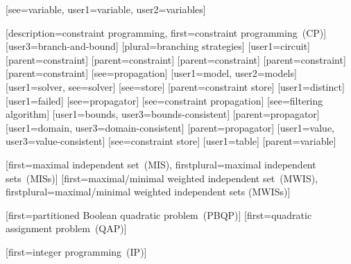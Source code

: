 [see={variable}, user1={variable}, user2={variables}]

%
        [description={constraint programming},
         first={constraint programming~(CP)}]
[user3={branch-and-bound}]
[plural={branching strategies}]
[user1={circuit}]
[parent={constraint}]
[parent={constraint}]
[parent={constraint}]
[parent={constraint}]
[parent={constraint}]
[see={propagation}]
[user1={model}, user2={models}]
[user1={solver}, see={solver}]
[see={store}]
[parent={constraint store}]
[user1={distinct}]
[user1={failed}]
[see={propagator}]
[see={constraint propagation}]
[see={filtering algorithm}]
[user1={bounds}, user3={bounds-consistent}]
[parent={propagator}]
[user1={domain}, user3={domain-consistent}]
[parent={propagator}]
[user1={value}, user3={value-consistent}]
[see={constraint store}]
[user1={table}]
[parent={variable}]


%
        [first={maximal independent set~(MIS)},
         firstplural={maximal independent sets~(MISs)}]
%
        [first={maximal/minimal weighted independent set~(MWIS)},
         firstplural={maximal/minimal weighted independent sets (MWISs)}]

%
        [first={partitioned Boolean quadratic problem~(PBQP)}]
%
        [first={quadratic assignment problem~(QAP)}]

%
        [first={integer programming~(IP)}]

